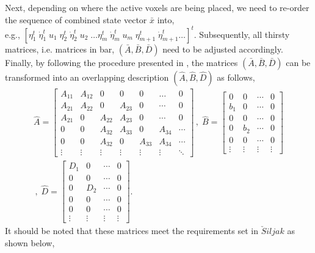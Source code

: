 \documentclass[11pt]{ucthesis}
\begin{document}
Next, depending on where the active voxels are being placed, we need to re-order the sequence of combined state vector $\bar{x}$ into, \\e.g., $[\eta_{1}^t \; \dot{\eta}_{1}^t \;u_1 \; \eta_{2}^t \; \dot{\eta}_{2}^t \;u_2 \;\ldots \eta_{m}^t \; \dot{\eta}_{m}^t \;u_m \;\eta_{m+1}^t \; \dot{\eta}_{m+1}^t \ldots]^t$. Subsequently, all thirsty matrices, i.e. matrices in bar, $(\bar{A}, \bar{B}, \bar{D})$ need to be adjusted accordingly. Finally, by following the procedure presented in \cite{zevcevic2005new,siljak2011decentralized}, the matrices $(\bar{A}, \bar{B}, \bar{D})$ can be transformed into an overlapping description $(\hat{A}, \hat{B}, \hat{D})$ as follows,
\begin{equation}
\begin{matrix}
\hat{A} =\left [
\begin{array}{cc|cc|cc|c}
A_{11}&A_{12}&0&0&0&\dots&0\\A_{21}&A_{22}&0&A_{23}&0&\cdots&0\\\hline A_{21}&0& A_{22}&A_{23}& 0&\cdots&0\\0&0&A_{32}&A_{33}&0&A_{34}&\cdots\\\hline0&0&A_{32}&0&A_{33}&A_{34} &\cdots\\\vdots&\vdots&\vdots&\vdots&\vdots&\vdots&\ddots
\end{array}\right ]\,,\; 
\hat{B} = \left [\begin{array}{c|c|c|c}
0&0&\cdots&0\\
b_{1} &0&\cdots&0\\\hline 0&0&\cdots&0\\0&b_{2}&\cdots&0\\\hline 0&0&\cdots&0 \\
\vdots & \vdots & \vdots & \vdots
\end{array}\right ]\\\,,\;
\hat{D} = \left [\begin{array}{c|c|c|c}
D_{1}&0&\cdots&0\\
0&0&\cdots&0\\\hline 0&D_{2}&\cdots&0\\0&0&\cdots&0\\\hline 0&0&\cdots&0 \\
\vdots & \vdots & \vdots & \vdots
\end{array}\right ] .
\end{matrix}
\label{eqn:hatM}
\end{equation}
It should be noted that these matrices meet the requirements set in $\check{S}iljak$ \cite{siljak2011decentralized} as shown below,
\end{document}
